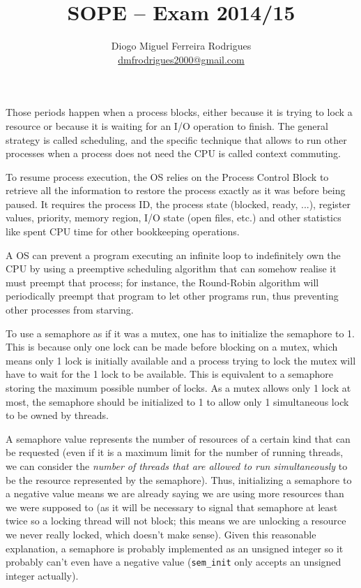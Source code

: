 \documentclass{sope}
\title{SOPE -- Exam 2014/15}
\author{Diogo Miguel Ferreira Rodrigues \\ \href{mailto:dmfrodrigues2000@gmail.com}{dmfrodrigues2000@gmail.com}}
\begin{document}
\setcounter{chapter}{14}
Those periods happen when a process blocks, either because it is trying to lock a resource or because it is waiting for an I/O operation to finish. The general strategy is called scheduling, and the specific technique that allows to run other processes when a process does not need the CPU is called context commuting.

To resume process execution, the OS relies on the Process Control Block to retrieve all the information to restore the process exactly as it was before being paused. It requires the process ID, the process state (blocked, ready, ...), register values, priority, memory region, I/O state (open files, etc.) and other statistics like spent CPU time for other bookkeeping operations.

A OS can prevent a program executing an infinite loop to indefinitely own the CPU by using a preemptive scheduling algorithm that can somehow realise it must preempt that process; for instance, the Round-Robin algorithm will periodically preempt that program to let other programs run, thus preventing other processes from starving.

To use a semaphore as if it was a mutex, one has to initialize the semaphore to 1. This is because only one lock can be made before blocking on a mutex, which means only 1 lock is initially available and a process trying to lock the mutex will have to wait for the 1 lock to be available. This is equivalent to a semaphore storing the maximum possible number of locks. As a mutex allows only 1 lock at most, the semaphore should be initialized to 1 to allow only 1 simultaneous lock to be owned by threads.

A semaphore value represents the number of resources of a certain kind that can be requested (even if it is a maximum limit for the number of running threads, we can consider the \emph{number of threads that are allowed to run simultaneously} to be the resource represented by the semaphore). Thus, initializing a semaphore to a negative value means we are already saying we are using more resources than we were supposed to (as it will be necessary to signal that semaphore at least twice so a locking thread will not block; this means we are unlocking a resource we never really locked, which doesn't make sense). Given this reasonable explanation, a semaphore is probably implemented as an unsigned integer so it probably can't even have a negative value (\texttt{sem\_init} only accepts an unsigned integer actually).
\end{document}
